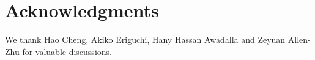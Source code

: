 \section*{Acknowledgments}
We thank Hao Cheng, Akiko Eriguchi, Hany Hassan Awadalla and Zeyuan Allen-Zhu for valuable discussions. 
